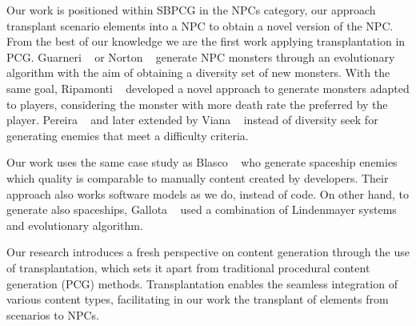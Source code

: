 Our work is positioned within SBPCG in the NPCs category, our approach transplant scenario elements into a NPC to obtain a novel version of the NPC. From the best of our knowledge we are the first work applying transplantation in PCG. Guarneri \etal~\cite{guarneri2013golem} or Norton \etal~\cite{norton2017monsters}  generate NPC monsters through an evolutionary algorithm with the aim of obtaining a diversity set of new monsters. With the same goal, Ripamonti \etal~\cite{ripamonti2021dragon} developed a novel approach to generate monsters adapted to players, considering the monster with more death rate the preferred by the player.
Pereira \etal~\cite{pereira2021procedural_enemies} and later extended by Viana \etal~\cite{viana2022illuminating} instead of diversity seek for generating enemies that meet a difficulty criteria.

Our work uses the same case study as Blasco \etal~\cite{blasco2021evolutionary} who generate spaceship enemies which quality is comparable to manually content created by developers. Their approach also works software models as we do, instead of code. On other hand, to generate also spaceships, Gallota \etal~\cite{gallotta2022evolving} used a combination of Lindenmayer systems~\cite{lindenmayer1968mathematical} and evolutionary algorithm.

Our research introduces a fresh perspective on content generation through the use of transplantation, which sets it apart from traditional procedural content generation (PCG) methods. Transplantation enables the seamless integration of various content types, facilitating in our work the transplant of elements from scenarios to NPCs.




